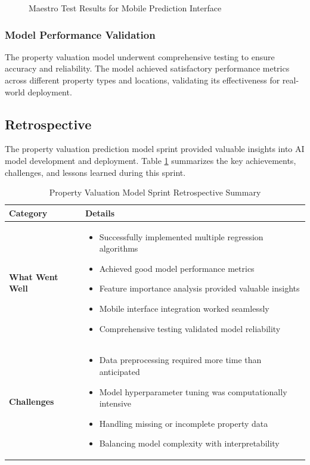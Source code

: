 \begin{figure}[htbp]
    \centering
    \caption{Maestro Test Results for Mobile Prediction Interface}
    \label{fig:maestro-tests-mobile}
\end{figure}

\subsubsection{Model Performance Validation}
The property valuation model underwent comprehensive testing to ensure accuracy and reliability. The model achieved satisfactory performance metrics across different property types and locations, validating its effectiveness for real-world deployment.

\subsection{Retrospective}

The property valuation prediction model sprint provided valuable insights into AI model development and deployment. Table \ref{tab:valuation-retrospective} summarizes the key achievements, challenges, and lessons learned during this sprint.
\newpage
\begin{table}[htbp]
    \centering
    \begin{tabular}{|p{3cm}|p{10cm}|}
        \hline
        \textbf{Category} & \textbf{Details} \\
        \hline
        \textbf{What Went Well} & 
        \begin{itemize}
            \item Successfully implemented multiple regression algorithms
            \item Achieved good model performance metrics
            \item Feature importance analysis provided valuable insights
            \item Mobile interface integration worked seamlessly
            \item Comprehensive testing validated model reliability
        \end{itemize} \\
        \hline
        \textbf{Challenges} & 
        \begin{itemize}
            \item Data preprocessing required more time than anticipated
            \item Model hyperparameter tuning was computationally intensive
            \item Handling missing or incomplete property data
            \item Balancing model complexity with interpretability
        \end{itemize} \\
        \hline
    \end{tabular}
    \caption{Property Valuation Model Sprint Retrospective Summary}
    \label{tab:valuation-retrospective}
\end{table}

